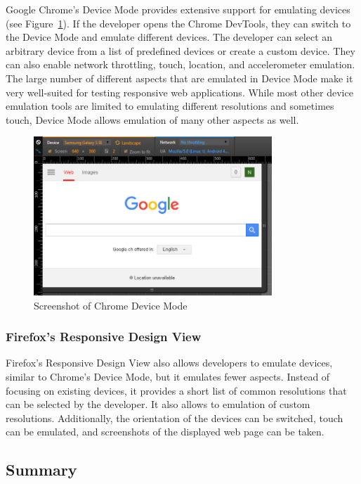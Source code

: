 Google Chrome's Device Mode provides extensive support for emulating devices (see Figure~\ref{fig:device_mode}). If the developer opens the Chrome DevTools, they can switch to the Device Mode and emulate different devices. The developer can select an arbitrary device from a list of predefined devices or create a custom device. They can also enable network throttling, touch, location, and accelerometer emulation. The large number of different aspects that are emulated in Device Mode make it very well-suited  for testing responsive web applications. While most other device emulation tools are limited to emulating different resolutions and sometimes touch, Device Mode allows emulation of many other aspects as well.

\begin{figure}[H]
  \centering
    \includegraphics[width=0.8\textwidth]{images/relatedwork/device_mode_2.png}
	\caption[Screenshot: Chrome Device Mode]{Screenshot of Chrome Device Mode}
	\label{fig:device_mode}
\end{figure}

\subsubsection{Firefox's Responsive Design View}

Firefox's Responsive Design View also allows developers to emulate devices, similar to Chrome's Device Mode, but it emulates fewer aspects. Instead of focusing on existing devices, it provides a short list of common resolutions that can be selected by the developer. It also allows to emulation of custom resolutions. Additionally, the orientation of the devices can be switched, touch can be emulated, and screenshots of the displayed web page can be taken.

\subsection{Summary}

